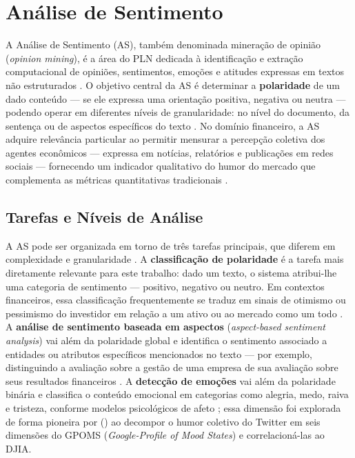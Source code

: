 
\section{Análise de Sentimento}
\label{sec:analise_sentimento}

A Análise de Sentimento (AS), também denominada mineração de opinião (\textit{opinion mining}), é a área do PLN dedicada à identificação e extração computacional de opiniões, sentimentos, emoções e atitudes expressas em textos não estruturados \cite{liu2020survey}. O objetivo central da AS é determinar a \textbf{polaridade} de um dado conteúdo --- se ele expressa uma orientação positiva, negativa ou neutra --- podendo operar em diferentes níveis de granularidade: no nível do documento, da sentença ou de aspectos específicos do texto \cite{jurafsky2026,liu2020survey}. No domínio financeiro, a AS adquire relevância particular ao permitir mensurar a percepção coletiva dos agentes econômicos --- expressa em notícias, relatórios e publicações em redes sociais --- fornecendo um indicador qualitativo do humor do mercado que complementa as métricas quantitativas tradicionais \cite{kearney2014,tetlock2007}.


\subsection{Tarefas e Níveis de Análise}
\label{subsec:as_tarefas}

A AS pode ser organizada em torno de três tarefas principais, que diferem em complexidade e granularidade \cite{liu2020survey,jurafsky2026}. A \textbf{classificação de	polaridade} é a tarefa mais diretamente relevante para este trabalho: dado um texto, o sistema atribui-lhe uma categoria de sentimento --- positivo, negativo ou neutro. Em contextos financeiros, essa classificação frequentemente se traduz em sinais de otimismo ou pessimismo do investidor em relação a um ativo ou ao mercado como um todo \cite{bollen2011,galdi2018}. A \textbf{análise de sentimento baseada em aspectos} (\textit{aspect-based sentiment analysis}) vai além da polaridade global e identifica o sentimento associado a entidades ou atributos específicos mencionados no texto --- por exemplo, distinguindo a avaliação sobre a gestão de uma empresa de sua avaliação sobre seus resultados financeiros \cite{liu2020survey}. A \textbf{detecção de emoções} vai além da polaridade binária e classifica o conteúdo emocional em categorias como alegria, medo, raiva e tristeza, conforme modelos psicológicos de afeto \cite{bollen2011}; essa dimensão foi explorada de forma pioneira por \citeauthor{bollen2011} (\citeyear{bollen2011}) ao decompor o humor coletivo do Twitter em seis dimensões do GPOMS (\textit{Google-Profile of Mood States}) e correlacioná-las ao DJIA.

